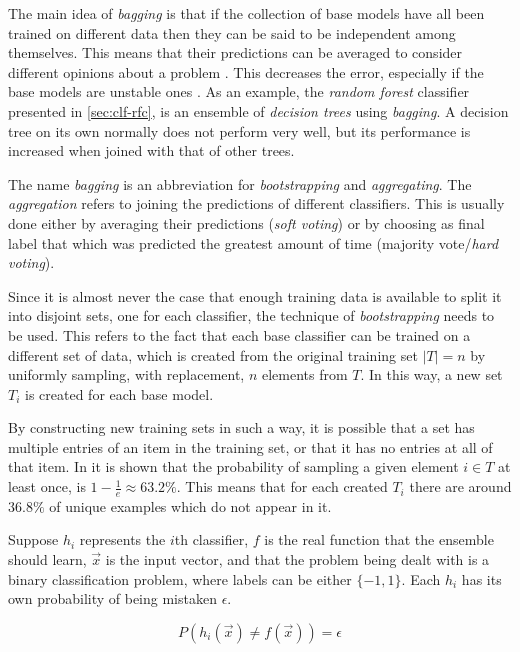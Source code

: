 \documentclass[epsfig,a4paper,11pt,titlepage,twoside,openany]{book}
\begin{document}
The main idea of \textit{bagging} \cite{zhou2012ensemble,Breiman1996_bagging_predictors} is that if the collection of base models have all been trained on different data then they can be said to be independent among themselves. This means that their predictions can be averaged to consider different opinions about a problem \cite{Breiman1996_bagging_predictors}. This decreases the error, especially if the base models are unstable ones \cite{zhou2012ensemble}. As an example, the \textit{random forest} classifier presented in \autoref{sec:clf-rfc}, is an ensemble of \textit{decision trees} using \textit{bagging}. A decision tree on its own normally does not perform very well, but its performance is increased when joined with that of other trees.

The name \textit{bagging} is an abbreviation for \textit{bootstrapping} and \textit{aggregating}. The \textit{aggregation} refers to joining the predictions of different classifiers. This is usually done either by averaging their predictions (\textit{soft voting}) or by choosing as final label that which was predicted the greatest amount of time (majority vote/\textit{hard voting}). 

Since it is almost never the case that enough training data is available to split it into disjoint sets, one for each classifier, the technique of \textit{bootstrapping} needs to be used. This refers to the fact that each base classifier can be trained on a different set of data, which is created from the original training set $|T| = n$ by uniformly sampling, with replacement, $n$ elements from $T$. In this way, a new set $T_i$ is created for each base model.

By constructing new training sets in such a way, it is possible that a set has multiple entries of an item in the training set, or that it has no entries at all of that item. In \cite{Breiman1996_bagging_predictors} it is shown that the probability of sampling a given element $i \in T$ at least once, is $1 - \frac{1}{e} \approx 63.2\%$. This means that for each created $T_i$ there are around $36.8\%$ of unique examples which do not appear in it.

Suppose $h_i$ represents the $i$th classifier, $f$ is the real function that the ensemble should learn, $\vec{x}$ is the input vector, and that the problem being dealt with is a binary classification problem, where labels can be either $\{-1,1\}$. Each $h_i$ has its own probability of being mistaken $\epsilon$.

\begin{equation*}
    P(h_i(\vec{x}) \neq f(\vec{x})) = \epsilon
\end{equation*}
\end{document}
